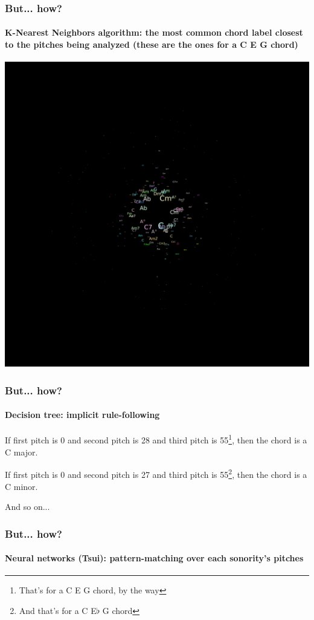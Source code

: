\documentclass{beamer}
\begin{document}
\begin{frame}
  \frametitle{But... how?}
  \framesubtitle{K-Nearest Neighbors algorithm: the most common chord
    label closest to the pitches being analyzed (these are the ones for a C E G chord)}
  \addvspace{0.5em}
  \includegraphics[scale=0.3, trim = 50em 0em 0em 51em, clip]{figs/knn}
\end{frame}

\begin{frame}
  \frametitle{But... how?}
  \framesubtitle{Decision tree: implicit rule-following}
    \begin{large}
      If first pitch is 0 and second pitch is 28 and third pitch is
      55\footnote{That's for a C E G chord, by the way}, then the chord is a C
      major.

      If first pitch is 0 and second pitch is 27 and third pitch is
      55\footnote{And that's for a C E$\flat$ G chord}, then the chord is a C
      minor.
    \end{large}
  \begin{center}

    \addvspace{3em}

    And so on...%
  \end{center}
\end{frame}


\begin{frame}
  \frametitle{But... how?}
  \framesubtitle{Neural networks (Tsui): pattern-matching over each sonority's
  pitches}


\end{frame}
\end{document}
